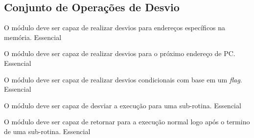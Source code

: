     \subsection{Conjunto de Operações de Desvio}
	    
	  \begin{functional}
		{O módulo deve ser capaz de realizar desvios para endereços específicos na memória.}
		{Essencial} 
		 
		 {O módulo deve ser capaz de realizar desvios para o próximo endereço de PC.}
		 {Essencial}
		 
		 {O módulo deve ser capaz de realizar desvios condicionais com base em um \textit{flag}.}
		 {Essencial}
		 
		 {O módulo deve ser capaz de desviar a execução para uma sub-rotina.}
		 {Essencial}
		 
		 {O módulo deve ser capaz de retornar para a execução normal logo após o  termino de uma sub-rotina.}
		 {Essencial}
         
	  \end{functional}